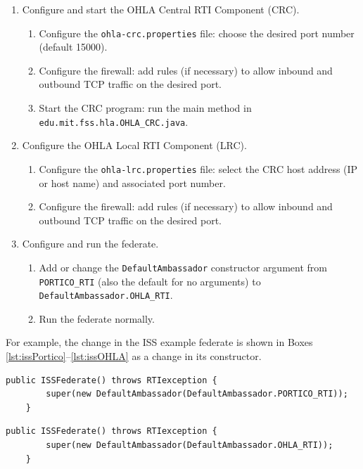 \documentclass[]{article}
\begin{document}
\begin{enumerate}
\item Configure and start the OHLA Central RTI Component (CRC).
\begin{enumerate}
\item Configure the \texttt{ohla-crc.properties} file: choose the desired port number (default 15000).
\item Configure the firewall: add rules (if necessary) to allow inbound and outbound TCP traffic on the desired port.
\item Start the CRC program: run the main method in \texttt{edu.mit.fss.hla.OHLA\_CRC.java}.
\end{enumerate}
\item Configure the OHLA Local RTI Component (LRC).
\begin{enumerate}
\item Configure the \texttt{ohla-lrc.properties} file: select the CRC host address (IP or host name) and associated port number.
\item Configure the firewall: add rules (if necessary) to allow inbound and outbound TCP traffic on the desired port.
\end{enumerate}
\item Configure and run the federate.
\begin{enumerate}
\item Add or change the \texttt{DefaultAmbassador} constructor argument from \texttt{PORTICO\_RTI} (also the default for no arguments) to \texttt{DefaultAmbassador.OHLA\_RTI}.
\item Run the federate normally.
\end{enumerate}
\end{enumerate}

For example, the change in the ISS example federate is shown in Boxes \ref{lst:issPortico}--\ref{lst:issOHLA} as a change in its constructor.

\begin{Code}
\begin{lstlisting}[caption={ISSFederate constructor with Portico RTI},label={lst:issPortico}]
	public ISSFederate() throws RTIexception {
		super(new DefaultAmbassador(DefaultAmbassador.PORTICO_RTI));
	}
\end{lstlisting}

\begin{lstlisting}[caption={ISSFederate constructor with OHLA RTI},label={lst:issOHLA}]
	public ISSFederate() throws RTIexception {
		super(new DefaultAmbassador(DefaultAmbassador.OHLA_RTI));
	}
\end{lstlisting}
\end{Code}
\end{document}

